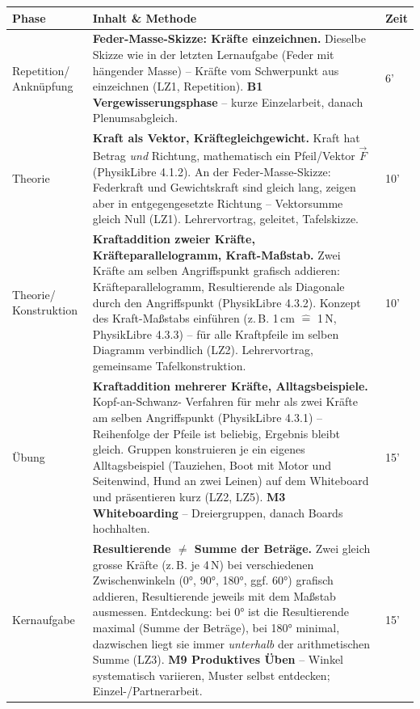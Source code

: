 \documentclass[11pt,a4paper]{article}
\newcommand{\Methode}[1]{{\small\color{groupteal}\textbf{#1}}}
\begin{document}
\begin{xltabular}{\textwidth}{@{}p{2.6cm}X p{1.2cm}@{}}
\toprule
\textbf{Phase} & \textbf{Inhalt \& Methode} & \textbf{Zeit} \\
\midrule
\endhead

Repetition/ Anknüpfung &
\textbf{Feder-Masse-Skizze: Kräfte einzeichnen.} Dieselbe Skizze wie in
der letzten Lernaufgabe (Feder mit hängender Masse) -- Kräfte vom
Schwerpunkt aus einzeichnen (LZ1, Repetition). \Methode{B1
Vergewisserungsphase} -- kurze Einzelarbeit, danach Plenumsabgleich. &
6' \\[0.4em]

Theorie &
\textbf{Kraft als Vektor, Kräftegleichgewicht.} Kraft hat Betrag
\emph{und} Richtung, mathematisch ein Pfeil/Vektor $\vec F$ (PhysikLibre
4.1.2). An der Feder-Masse-Skizze: Federkraft und Gewichtskraft sind
gleich lang, zeigen aber in entgegengesetzte Richtung -- Vektorsumme
gleich Null (LZ1). Lehrervortrag, geleitet, Tafelskizze. &
10' \\[0.4em]

Theorie/ Konstruktion &
\textbf{Kraftaddition zweier Kräfte, Kräfteparallelogramm, Kraft-Maßstab.}
Zwei Kräfte am selben Angriffspunkt grafisch addieren: Kräfteparallelogramm,
Resultierende als Diagonale durch den Angriffspunkt (PhysikLibre 4.3.2).
Konzept des Kraft-Maßstabs einführen (z.\,B. 1\,cm $\hat=$ 1\,N, PhysikLibre
4.3.3) -- für alle Kraftpfeile im selben Diagramm verbindlich (LZ2).
Lehrervortrag, gemeinsame Tafelkonstruktion. &
10' \\[0.4em]

Übung &
\textbf{Kraftaddition mehrerer Kräfte, Alltagsbeispiele.} Kopf-an-Schwanz-
Verfahren für mehr als zwei Kräfte am selben Angriffspunkt (PhysikLibre
4.3.1) -- Reihenfolge der Pfeile ist beliebig, Ergebnis bleibt gleich.
Gruppen konstruieren je ein eigenes Alltagsbeispiel (Tauziehen, Boot mit
Motor und Seitenwind, Hund an zwei Leinen) auf dem Whiteboard und
präsentieren kurz (LZ2, LZ5). \Methode{M3 Whiteboarding} -- Dreiergruppen,
danach Boards hochhalten. &
15' \\[0.4em]

Kernaufgabe &
\textbf{Resultierende $\neq$ Summe der Beträge.} Zwei gleich grosse Kräfte
(z.\,B. je 4\,N) bei verschiedenen Zwischenwinkeln (0°, 90°, 180°, ggf.
60°) grafisch addieren, Resultierende jeweils mit dem Maßstab ausmessen.
Entdeckung: bei 0° ist die Resultierende maximal (Summe der Beträge), bei
180° minimal, dazwischen liegt sie immer \emph{unterhalb} der
arithmetischen Summe (LZ3). \Methode{M9 Produktives Üben} -- Winkel
systematisch variieren, Muster selbst entdecken; Einzel-/Partnerarbeit. &
15' \\[0.4em]


\end{xltabular}
\end{document}
